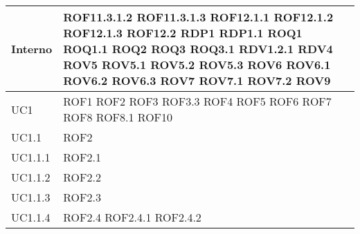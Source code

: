 \begin{center}
\begin{longtable}{| p{4cm} | p{4cm} |}
\hline
Interno & ROF11.3.1.2 \newline ROF11.3.1.3 \newline ROF12.1.1 \newline ROF12.1.2 \newline ROF12.1.3 \newline ROF12.2 \newline RDP1 \newline RDP1.1 \newline ROQ1 \newline ROQ1.1 \newline ROQ2 \newline ROQ3 \newline ROQ3.1 \newline RDV1.2.1 \newline RDV4 \newline ROV5 \newline ROV5.1 \newline ROV5.2 \newline ROV5.3 \newline ROV6 \newline ROV6.1 \newline ROV6.2 \newline ROV6.3 \newline ROV7 \newline ROV7.1 \newline ROV7.2 \newline ROV9 \newline \\
\hline
UC1 & ROF1 \newline ROF2 \newline ROF3 \newline ROF3.3 \newline ROF4 \newline ROF5 \newline ROF6 \newline ROF7 \newline ROF8 \newline ROF8.1 \newline ROF10 \\
\hline
UC1.1 & ROF2 \\
\hline
UC1.1.1 & ROF2.1 \\
\hline
UC1.1.2 & ROF2.2 \\
\hline
UC1.1.3 & ROF2.3 \\
\hline
UC1.1.4 & ROF2.4 \newline ROF2.4.1 \newline ROF2.4.2 \\

\end{longtable}
\end{center}

